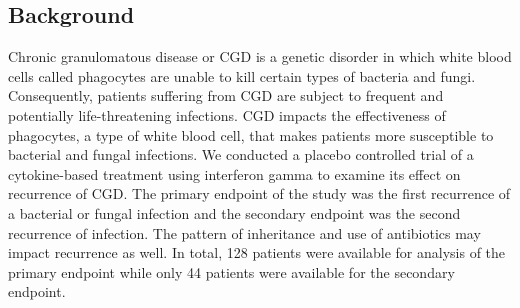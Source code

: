 \documentclass{article}
\begin{document}
\begin{enumerate}
	\subsection*{Background}

	Chronic granulomatous disease or CGD is a genetic disorder in which white blood cells called phagocytes are unable to kill certain types of bacteria and fungi. Consequently, patients suffering from CGD are subject to frequent and potentially life-threatening infections. CGD impacts the effectiveness of phagocytes, a type of white blood cell, that makes patients more susceptible to bacterial and fungal infections. We conducted a placebo controlled trial of a cytokine-based treatment using interferon gamma to examine its effect on recurrence of CGD. The primary endpoint of the study was the first recurrence of a bacterial or fungal infection and the secondary endpoint was the second recurrence of infection. The pattern of inheritance and use of antibiotics may impact recurrence as well. In total, 128 patients were available for analysis of the primary endpoint while only 44 patients were available for the secondary endpoint.

		
	
	\end{enumerate}
		
\end{document}
